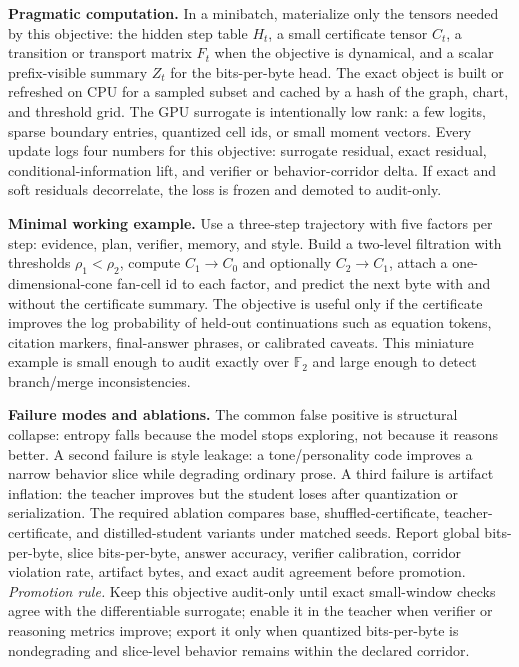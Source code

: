 \documentclass[10pt]{article}
\newcommand{\FF}{\mathbb{F}}
\numberwithin{equation}{section}
\begin{document}
\noindent\textbf{Pragmatic computation.} In a minibatch, materialize only the tensors needed by this objective: the hidden step table $H_t$, a small certificate tensor $C_t$, a transition or transport matrix $F_t$ when the objective is dynamical, and a scalar prefix-visible summary $Z_t$ for the bits-per-byte head. The exact object is built or refreshed on CPU for a sampled subset and cached by a hash of the graph, chart, and threshold grid. The GPU surrogate is intentionally low rank: a few logits, sparse boundary entries, quantized cell ids, or small moment vectors. Every update logs four numbers for this objective: surrogate residual, exact residual, conditional-information lift, and verifier or behavior-corridor delta. If exact and soft residuals decorrelate, the loss is frozen and demoted to audit-only.

\noindent\textbf{Minimal working example.} Use a three-step trajectory with five factors per step: evidence, plan, verifier, memory, and style. Build a two-level filtration with thresholds $\rho_1<\rho_2$, compute $C_1\to C_0$ and optionally $C_2\to C_1$, attach a one-dimensional-cone fan-cell id to each factor, and predict the next byte with and without the certificate summary. The objective is useful only if the certificate improves the log probability of held-out continuations such as equation tokens, citation markers, final-answer phrases, or calibrated caveats. This miniature example is small enough to audit exactly over $\FF_2$ and large enough to detect branch/merge inconsistencies.

\noindent\textbf{Failure modes and ablations.} The common false positive is structural collapse: entropy falls because the model stops exploring, not because it reasons better. A second failure is style leakage: a tone/personality code improves a narrow behavior slice while degrading ordinary prose. A third failure is artifact inflation: the teacher improves but the student loses after quantization or serialization. The required ablation compares base, shuffled-certificate, teacher-certificate, and distilled-student variants under matched seeds. Report global bits-per-byte, slice bits-per-byte, answer accuracy, verifier calibration, corridor violation rate, artifact bytes, and exact audit agreement before promotion.
\vfill
\noindent\emph{Promotion rule.} Keep this objective audit-only until exact small-window checks agree with the differentiable surrogate; enable it in the teacher when verifier or reasoning metrics improve; export it only when quantized bits-per-byte is nondegrading and slice-level behavior remains within the declared corridor.
\end{document}
